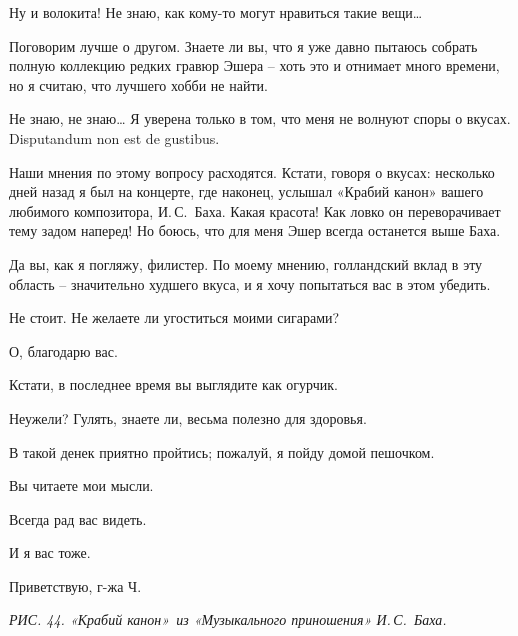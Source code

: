 \documentclass[../main.tex]{subfiles}
\begin{document}
\begin{dialogue}
 Ну и волокита! Не знаю, как кому-то могут нравиться такие вещи\ldots{}

 Поговорим лучше о другом. Знаете ли вы, что я уже давно пытаюсь собрать полную коллекцию редких гравюр Эшера \--- хоть это и отнимает много времени, но я считаю, что лучшего хобби не найти.

 Не знаю, не знаю\ldots{} Я уверена только в том, что меня не волнуют споры о вкусах. Disputandum non est de gustibus.

 Наши мнения по этому вопросу расходятся. Кстати, говоря о вкусах: несколько дней назад я был на концерте, где наконец, услышал «Крабий канон» вашего любимого композитора, И.\,С.~Баха. Какая красота! Как ловко он переворачивает тему задом наперед! Но боюсь, что для меня Эшер всегда останется выше Баха.

 Да вы, как я погляжу, филистер. По моему мнению, голландский вклад в эту область \--- значительно худшего вкуса, и я хочу попытаться вас в этом убедить.

 Не стоит. Не желаете ли угоститься моими сигарами?

 О, благодарю вас.

 Кстати, в последнее время вы выглядите как огурчик.

 Неужели? Гулять, знаете ли, весьма полезно для здоровья.

 В такой денек приятно пройтись; пожалуй, я пойду домой пешочком.

 Вы читаете мои мысли.

 Всегда рад вас видеть.

 И я вас тоже.

 Приветствую, г-жа Ч.

\emph{РИС. 44. «Крабий канон»~из «Музыкального приношения» И.\,С.~Баха.}

\end{dialogue}
\end{document}
